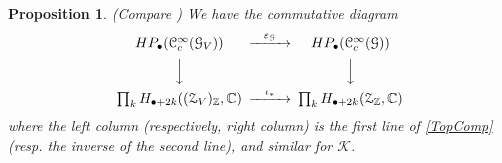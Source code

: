 \documentclass[a4paper]{amsart}
\newcommand{\CC}{\mathbb C}
\newcommand{\ZZ}{\mathbb Z}
\newcommand{\maC}{\mathcal C}
\newcommand{\maG}{\mathcal G}
\newcommand{\maK}{\mathcal K}
\newcommand{\maZ}{\mathcal Z}
\newcommand\<{\langle}
\renewcommand\>{\rangle}
\newtheorem{prop}[theorem]{Proposition}
\theoremstyle{definition}
\theoremstyle{remark}
\begin{document}
\begin{prop}
(Compare \cite[Theorem 4.4]{Crainic;EtaleGpoid}) We have the commutative diagram
\begin{equation}
\label{CD5}
\begin{CD}
H P _\bullet (\maC^\infty _c (\maG _V)) @>{\varepsilon _\maG}>> H P _\bullet (\maC^\infty _c (\maG)) \\
@VVV @VVV \\
\prod _k  H _{\bullet + 2 k} ( (\maZ _V ) _\ZZ , \CC)
@>{\iota _*}>> \prod _{k} H_ {\bullet + 2 k} (\maZ _\ZZ , \CC)
\end{CD}
\end{equation}
where the left column (respectively, right column) is the first line of \eqref{TopComp} (resp. the inverse of the second line),
and similar for $\maK$.
\end{prop}
\end{document}
